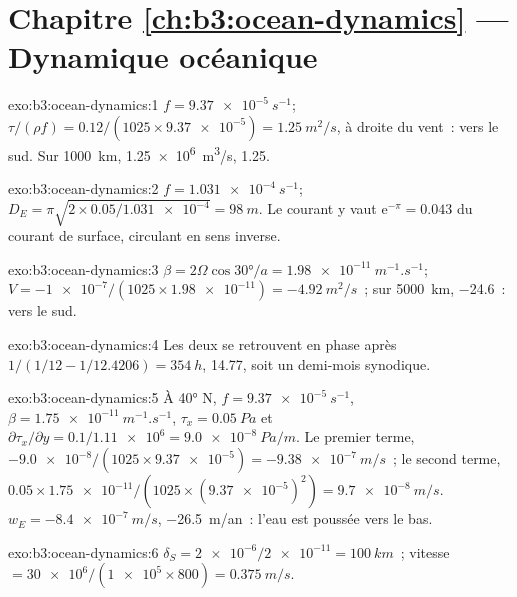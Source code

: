 \section*{Chapitre \ref{ch:b3:ocean-dynamics} --- Dynamique océanique}

\begin{solution}{exo:b3:ocean-dynamics:1}
$f = \qty{9.37e-5}{s^{-1}}$; $\tau/(\rho f) = 0.12/(1025\times\num{9.37e-5})
= \qty{1.25}{m^2/s}$, à droite du vent~: vers le sud. Sur
\qty{1000}{km}, \qty{1.25e6}{m^3/s}, \qty{1.25}{\sverdrup}.
\end{solution}

\begin{solution}{exo:b3:ocean-dynamics:2}
$f = \qty{1.031e-4}{s^{-1}}$; $D_E = \pi\sqrt{2\times0.05/\num{1.031e-4}}
= \qty{98}{m}$. Le courant y vaut $\mathrm e^{-\pi} = \num{0.043}$ du
courant de surface, circulant en sens inverse.
\end{solution}

\begin{solution}{exo:b3:ocean-dynamics:3}
$\beta = 2\Omega\cos\ang{30}/a = \qty{1.98e-11}{m^{-1}.s^{-1}}$; $V =
\num{-1e-7}/(1025\times\num{1.98e-11}) = \qty{-4.92}{m^2/s}$~; sur
\qty{5000}{km}, \qty{-24.6}{\sverdrup}~: vers le sud.
\end{solution}

\begin{solution}{exo:b3:ocean-dynamics:4}
Les deux  se retrouvent en phase après $1/(1/12 - 1/12.4206) =
\qty{354}{h}$, \num{14.77}, soit un demi-mois synodique.
\end{solution}

\begin{solution}{exo:b3:ocean-dynamics:5}
À \ang{40} N, $f = \qty{9.37e-5}{s^{-1}}$, $\beta =
\qty{1.75e-11}{m^{-1}.s^{-1}}$, $\tau_x = \qty{0.05}{Pa}$ et
$\partial\tau_x/\partial y = 0.1/\num{1.11e6} = \qty{9.0e-8}{Pa/m}$. Le
premier terme, $-\num{9.0e-8}/(1025\times\num{9.37e-5}) =
\qty{-9.38e-7}{m/s}$~; le second terme, $0.05\times\num{1.75e-11}/(1025\times
(\num{9.37e-5})^2) = \qty{+9.7e-8}{m/s}$. $w_E = \qty{-8.4e-7}{m/s}$,
\qty{-26.5}{m/an}~: l'eau est poussée vers le bas.
\end{solution}

\begin{solution}{exo:b3:ocean-dynamics:6}
$\delta_S = \num{2e-6}/\num{2e-11} = \qty{100}{km}$~; vitesse $=
\num{30e6}/(\num{1e5}\times800) = \qty{0.375}{m/s}$.
\end{solution}

